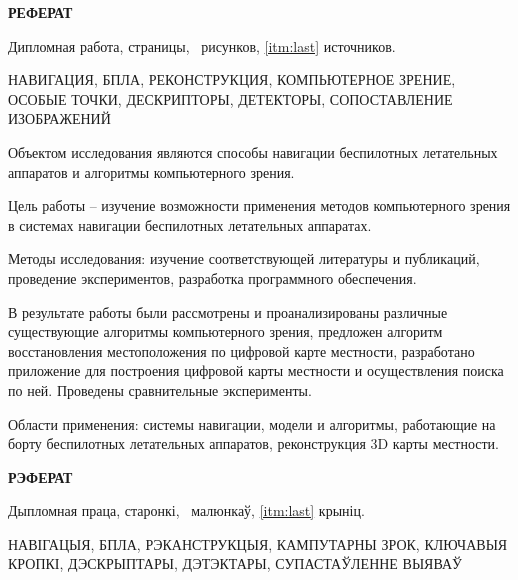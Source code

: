 \begin{center}
  \large\bfseries{РЕФЕРАТ}
\end{center}

Дипломная работа, \pageref{LastPage} страницы, \totalfigures\ рисунков, \ref{itm:last} источников.

\begin{justify}
    \large{НАВИГАЦИЯ, БПЛА, РЕКОНСТРУКЦИЯ, КОМПЬЮТЕРНОЕ ЗРЕНИЕ, ОСОБЫЕ ТОЧКИ, ДЕСКРИПТОРЫ, ДЕТЕКТОРЫ, СОПОСТАВЛЕНИЕ ИЗОБРАЖЕНИЙ}
\end{justify}

Объектом исследования являются способы навигации беспилотных летательных аппаратов и алгоритмы компьютерного зрения.

\vspace{1em}

Цель работы -- изучение возможности применения методов компьютерного зрения в системах навигации беспилотных летательных аппаратах.

\vspace{1em}

Методы исследования: изучение соответствующей литературы и публикаций, проведение экспериментов, разработка программного обеспечения.

\vspace{1em}

В результате работы были рассмотрены и проанализированы различные существующие алгоритмы компьютерного зрения, предложен алгоритм восстановления местоположения по цифровой карте местности, разработано приложение для построения цифровой карты местности и осуществления поиска по ней. Проведены сравнительные эксперименты.

\vspace{1em}

Области применения: системы навигации, модели и алгоритмы, работающие на борту беспилотных летательных аппаратов, реконструкция 3D карты местности.
\newpage



\begin{center}
     \large\bfseries{РЭФЕРАТ}
\end{center}

Дыпломная праца, \pageref{LastPage} старонкі, \totalfigures\ малюнкаў, \ref{itm:last} крыніц.

\begin{justify}
  \large{НАВІГАЦЫЯ, БПЛА, РЭКАНСТРУКЦЫЯ, КАМПУТАРНЫ ЗРОК, КЛЮЧАВЫЯ КРОПКІ, ДЭСКРЫПТАРЫ, ДЭТЭКТАРЫ, СУПАСТАЎЛЕННЕ ВЫЯВАЎ}
\end{justify}

